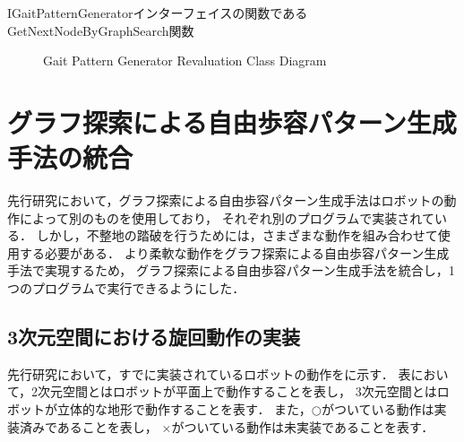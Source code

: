 IGaitPatternGeneratorインターフェイスの関数であるGetNextNodeByGraphSearch関数
\begin{figure}[htbp]
  \centering
  \caption{Gait Pattern Generator Revaluation Class Diagram}
  \label{fig:gait_pattern_generator_revaluation}  %
\end{figure}

\section{グラフ探索による自由歩容パターン生成手法の統合}
先行研究において，グラフ探索による自由歩容パターン生成手法はロボットの動作によって別のものを使用しており，
それぞれ別のプログラムで実装されている．
しかし，不整地の踏破を行うためには，さまざまな動作を組み合わせて使用する必要がある．
より柔軟な動作をグラフ探索による自由歩容パターン生成手法で実現するため，
グラフ探索による自由歩容パターン生成手法を統合し，1つのプログラムで実行できるようにした．

\subsection{3次元空間における旋回動作の実装}
先行研究において，すでに実装されているロボットの動作をに示す．
表において，2次元空間とはロボットが平面上で動作することを表し，
3次元空間とはロボットが立体的な地形で動作することを表す．
また，$\bigcirc$がついている動作は実装済みであることを表し，
$\times$がついている動作は未実装であることを表す．


